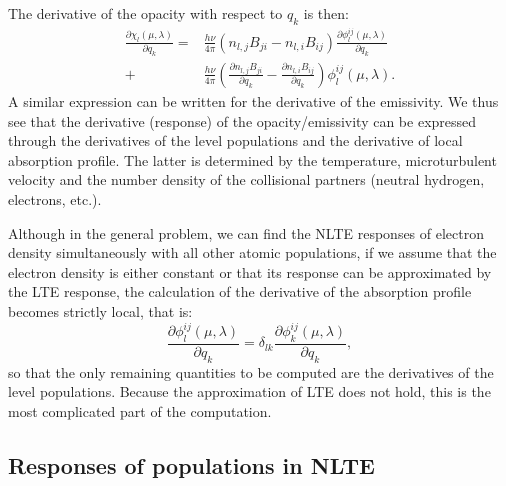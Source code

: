 \documentclass{aa}
\begin{document}
The derivative of the opacity with respect to $q_k$ is then:
\begin{align}
  \frac{\partial \chi_l(\mu,\lambda)}{\partial q_k} = & \frac{h\nu}{4\pi}(n_{l,j} B_{ji} - n_{l,i}B_{ij}) \frac{\partial\phi^{ij}_l(\mu,\lambda)}{\partial q_k} \nonumber \\
 + & \frac{h\nu}{4\pi}(\frac{\partial n_{l,j} B_{ji}}{\partial q_k} - \frac{\partial n_{l,i}B_{ij}}{\partial q_k}) \phi^{ij}_l(\mu,\lambda).
 \label{chi_derivative}
\end{align}
A similar expression can be written for the derivative of the emissivity. We thus see that the derivative (response) of the opacity/emissivity can be expressed through the derivatives of the level populations and the derivative of local absorption profile. The latter is determined by the temperature, microturbulent velocity and the number density of the collisional partners (neutral hydrogen, electrons, etc.). 

Although in the general problem, we can find the NLTE responses of electron density simultaneously with all other atomic populations, if we assume that the electron density is either constant or that its response can be approximated by the LTE response, the calculation of the derivative of the absorption profile becomes strictly local, that is:
\begin{equation}
 \frac{\partial\phi^{ij}_l(\mu,\lambda)}{\partial q_k} = \delta_{lk} \frac{\partial\phi^{ij}_k(\mu,\lambda)}{\partial q_k},
\end{equation}
so that the only remaining quantities to be computed are the derivatives of the level populations. Because the approximation of LTE does not hold, this is the most complicated part of the computation.

\subsection{Responses of populations in NLTE}
\label{nlte_lvls}
\end{document}
